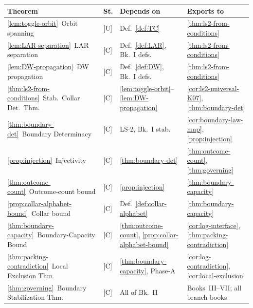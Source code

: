 \documentclass[12pt,oneside]{amsbook}
\theoremstyle{plain}
\theoremstyle{definition}
\theoremstyle{remark}
\begin{document}
\renewcommand{\arraystretch}{1.4}
\noindent
\small
\begin{tabular}{@{}p{3.6cm}p{0.8cm}p{3.8cm}p{4.8cm}@{}}
\hline
\textbf{Theorem} & \textbf{St.} & \textbf{Depends on} & \textbf{Exports to} \\
\hline
\ref{lem:toggle-orbit}\ Orbit spanning
  & [U] & Def.~\ref{def:TC}
  & \ref{thm:ls2-from-conditions} \\

\ref{lem:LAR-separation}\ LAR separation
  & [C] & Def.~\ref{def:LAR}, Bk.~I defs.
  & \ref{thm:ls2-from-conditions} \\

\ref{lem:DW-propagation}\ DW propagation
  & [C] & Def.~\ref{def:DW}, Bk.~I defs.
  & \ref{thm:ls2-from-conditions} \\

\ref{thm:ls2-from-conditions}\ Stab.\ Collar Det.\ Thm.
  & [C] & \ref{lem:toggle-orbit}--\ref{lem:DW-propagation}
  & \ref{cor:ls2-universal-K07}, \ref{thm:boundary-det} \\

\ref{thm:boundary-det}\ Boundary Determinacy
  & [C] & LS-2, Bk.~I stab.
  & \ref{cor:boundary-law-map}, \ref{prop:injection} \\

\ref{prop:injection}\ Injectivity
  & [C] & \ref{thm:boundary-det}
  & \ref{thm:outcome-count}, \ref{thm:governing} \\

\ref{thm:outcome-count}\ Outcome-count bound
  & [C] & \ref{prop:injection}
  & \ref{thm:boundary-capacity} \\

\ref{prop:collar-alphabet-bound}\ Collar bound
  & [C] & Def.~\ref{def:collar-alphabet}
  & \ref{thm:boundary-capacity} \\

\ref{thm:boundary-capacity}\ Boundary-Capacity Bound
  & [C] & \ref{thm:outcome-count}, \ref{prop:collar-alphabet-bound}
  & \ref{cor:log-interface}, \ref{thm:packing-contradiction} \\

\ref{thm:packing-contradiction}\ Local Exclusion Thm.
  & [C] & \ref{thm:boundary-capacity}, Phase-A
  & \ref{cor:log-contradiction}, \ref{cor:local-exclusion} \\

\ref{thm:governing}\ Boundary Stabilization Thm.
  & [C] & All of Bk.~II
  & Books~III--VII; all branch books \\


\end{tabular}
\end{document}
